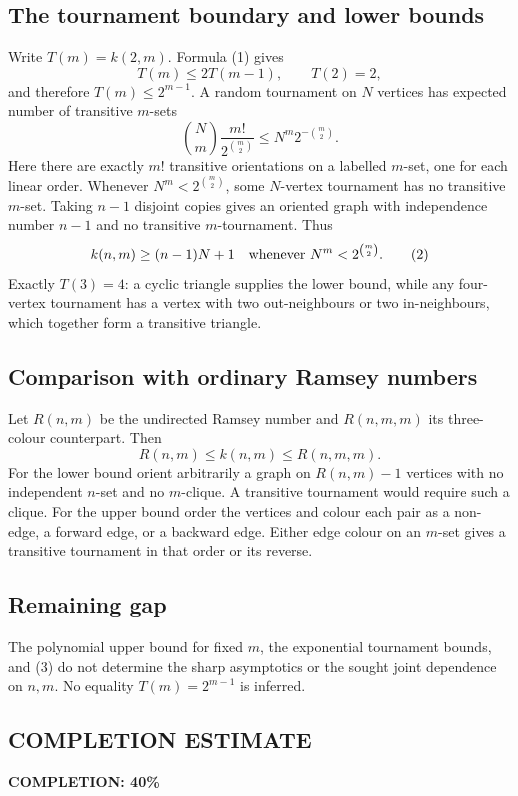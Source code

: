 \subsection*{The tournament boundary and lower bounds}
Write $T(m)=k(2,m)$. Formula (1) gives
\[
 T(m)\le2T(m-1),\qquad T(2)=2,
\]
and therefore $T(m)\le2^{m-1}$. A random tournament on $N$ vertices has expected number of transitive $m$-sets
\[
 {N\choose m}\frac{m!}{2^{\binom m2}}
 \le N^m2^{-\binom m2}.
\]
Here there are exactly $m!$ transitive orientations on a labelled $m$-set, one for each linear order. Whenever $N^m<2^{\binom m2}$, some $N$-vertex tournament has no transitive $m$-set. Taking $n-1$ disjoint copies gives an oriented graph with independence number $n-1$ and no transitive $m$-tournament. Thus
\[
 k(n,m)\ge(n-1)N+1
 \quad\hbox{whenever }N^m<2^{\binom m2}. \tag{2}
\]
Exactly $T(3)=4$: a cyclic triangle supplies the lower bound, while any four-vertex tournament has a vertex with two out-neighbours or two in-neighbours, which together form a transitive triangle.

\subsection*{Comparison with ordinary Ramsey numbers}
Let $R(n,m)$ be the undirected Ramsey number and $R(n,m,m)$ its three-colour counterpart. Then
\[
 R(n,m)\le k(n,m)\le R(n,m,m). \tag{3}
\]
For the lower bound orient arbitrarily a graph on $R(n,m)-1$ vertices with no independent $n$-set and no $m$-clique. A transitive tournament would require such a clique. For the upper bound order the vertices and colour each pair as a non-edge, a forward edge, or a backward edge. Either edge colour on an $m$-set gives a transitive tournament in that order or its reverse.

\subsection*{Remaining gap}
The polynomial upper bound for fixed $m$, the exponential tournament bounds, and (3) do not determine the sharp asymptotics or the sought joint dependence on $n,m$. No equality $T(m)=2^{m-1}$ is inferred.
\subsection*{COMPLETION ESTIMATE}
\textbf{COMPLETION: 40\%}
